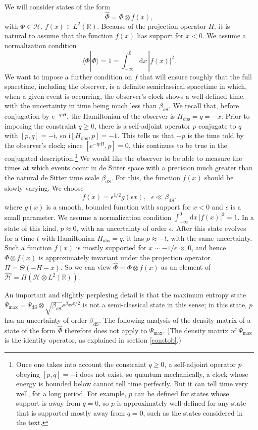 \documentclass[11pt,a4paper]{article}
\def\max{{\mathrm{max}}}
\def\be{\begin{equation}}
\def\ee{\end{equation}}
\def\h{\widehat}
\def\d{{\mathrm d}}
\def\R{{\mathbb R}}
\def\h{\widehat}
\def\H{{\mathcal H}}
\def\dS{{\mathrm{dS}}}
\def\la{\langle}
\def\ra{\rangle}
\def\obs{{\mathrm{obs}}}
\def\i{{\mathrm i}}
\begin{document}
We will consider states of the form 
\be\label{newstate}\h\Phi =\Phi\otimes f(x) ,\ee
with $\Phi \in\H$, $f(x)\in L^2(\R)$.  
Because of the projection operator $\Pi$, it is natural to assume that the function $f(x)$ has support for $x<0$.   We assume a normalization condition
\be\label{normcon}\la\Phi|\Phi\ra =1 =\int_{-\infty}^0\d x \,|f(x)|^2. \ee
We want to impose a further condition on $f$ that will ensure 
roughly that the full spacetime, including the observer, is a definite semiclassical spacetime in which, when a given event is occurring, the observer's clock
shows a well-defined time, with the uncertainty in time being much less than $\beta_\dS$.
  We recall that, before conjugation by $e^{-\i p H}$, the Hamiltonian of the observer is $H_\obs =q=-x$.  Prior to imposing the constraint
$q\geq 0$, there is a self-adjoint operator $p$ conjugate to $q$ with $[p,q]=-\i$, so $\i [H_\obs,p]=-1$.   This tells us that $-p$ is the time told by the observer's 
clock; since $[e^{-\i p H},p] = 0$, this continues to be true in the conjugated description.\footnote{Once one takes into account the constraint $q\geq 0$, a self-adjoint operator $p$ obeying $[p,q]=-\i$ does not exist, so quantum mechanically, a clock
whose energy is bounded below cannot tell time perfectly.  But it can tell time very well, for a long period.  For example, $p$ can be defined for states whose
support is away from $q=0$, so $p$ is approximately well-defined for any state that is supported mostly away from $q=0$, 
such as the states considered in the text.}  We would like the observer to be able to measure the
times at which events occur in de Sitter space with a precision much greater than the natural de Sitter time scale $\beta_\dS$.   For this, the function $f(x)$
should be slowly varying.   We choose
\be\label{zimbo} f(x) =\epsilon^{1/2} g(\epsilon x), ~~~\epsilon\ll \beta_\dS. \ee
where $g(x)$ is a smooth, bounded function with support for $x<0$ and  $\epsilon$ is a small parameter.   We assume a normalization condition
$\int_{-\infty}^0\d x \,|f(x)|^2=1$.
In a state of this kind, 
$p\approx 0$, with an uncertainty of order $\epsilon$.  After this state evolves for a time $t$ with Hamiltonian $H_\obs=q$,
 it has $p\approx -t$, with the same uncertainty.
Such a  function  $f(x)$  is mostly supported for $x\sim -{1}/{\epsilon} \ll0$, and hence 
 $\Phi\otimes f(x)$ is approximately invariant under the projection operator
 $\Pi=\Theta(-H-x)$.  So we can view $\h\Phi=\Phi\otimes f(x)$ as an element of $\h\H=\Pi (\H\otimes L^2(\R))$.   
 
 An important and slightly perplexing detail is that the maximum entropy state $\Psi_\max=\Psi_\dS \otimes \sqrt{\beta_\dS} e^{\beta_\dS x/2}$ is not
 a semi-classical state in this sense; in this state, $p$ has an uncertainty of order $\beta_\dS$.   The following analysis of the density matrix of a state of the form
 $\h\Phi$ therefore does not apply to $\Psi_\max$.  (The density matrix of $\Psi_\max$ is the identity operator, as explained in section \ref{constob}.)
\end{document}
